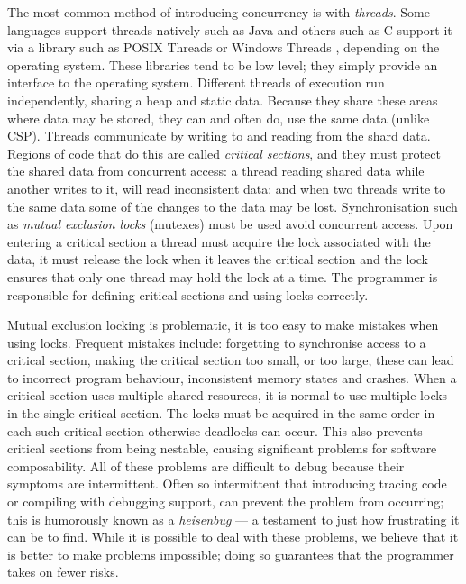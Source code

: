 The most common method of introducing concurrency is with \emph{threads}.
Some languages support threads natively such as Java \citep{java-threads}
and others such as C \citep{c} support it via a library
such as
POSIX Threads \citep{butenhof1997:pthreads} or Windows
Threads \citep{winthreads}, depending on the operating system.
These libraries tend to be low level;
they simply provide an interface to the operating system.
Different threads of execution run independently,
sharing a heap and static data.
Because they share these areas where data may be stored,
they can and often do,
use the same data (unlike CSP).
Threads communicate by writing to and reading from the shard data.
Regions of code that do this are called \emph{critical sections},
and they must protect the shared data from concurrent access:
a thread reading shared data while another writes to it, will read
inconsistent data;
and when two threads write to the same data some of the changes to the data
may be lost.
Synchronisation such as \emph{mutual exclusion locks} (mutexes)
\citep{Dijkstra:Mutex} must be used avoid concurrent access.
Upon entering a critical section a thread must acquire the lock associated with
the data,
it must release the lock when it leaves the critical section and the lock
ensures that only one thread may hold the lock at a time.
The programmer is responsible for defining critical sections and using locks
correctly.

Mutual exclusion locking is problematic,
it is too easy to make mistakes when using locks.
Frequent mistakes include: forgetting to synchronise access to a critical
section,
making the critical section too small, or too large,
these can lead to incorrect program behaviour, inconsistent memory states and
crashes.
When a critical section uses multiple shared resources,
it is normal to use multiple locks in the single critical section.
The locks must be acquired in the same order in each such critical section
otherwise deadlocks can occur.
This also prevents critical sections from being nestable,
causing significant problems for software composability.
All of these problems are difficult to debug because their symptoms are
intermittent.
Often so intermittent that introducing tracing code or compiling with debugging
support, can prevent the problem from occurring;
this is humorously known as a \emph{heisenbug} ---
a testament to just how frustrating it can be to find.
While it is possible to deal with these problems,
we believe that it is better to make problems impossible;
doing so guarantees that the programmer takes on fewer risks.

